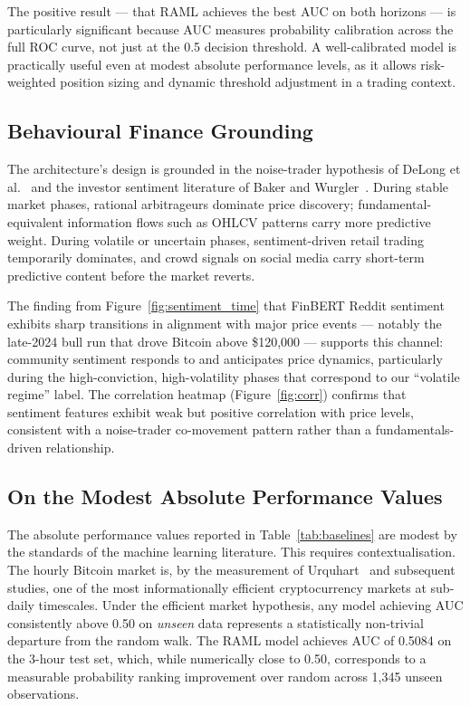 \documentclass[journal]{IEEEtran}
\newcommand{\raml}{\textsc{RAML}}
\begin{document}
The positive result — that \raml{} achieves the best AUC on both horizons —
is particularly significant because AUC measures probability calibration across
the full ROC curve, not just at the 0.5 decision threshold. A well-calibrated
model is practically useful even at modest absolute performance levels, as
it allows risk-weighted position sizing and dynamic threshold adjustment in
a trading context.

\subsection{Behavioural Finance Grounding}
The architecture's design is grounded in the noise-trader hypothesis of
DeLong et al.~\cite{delong1990noise} and the investor sentiment literature
of Baker and Wurgler~\cite{baker2007investor}. During stable market phases,
rational arbitrageurs dominate price discovery; fundamental-equivalent
information flows such as OHLCV patterns carry more predictive weight.
During volatile or uncertain phases, sentiment-driven retail trading
temporarily dominates, and crowd signals on social media carry short-term
predictive content before the market reverts.

The finding from Figure~\ref{fig:sentiment_time} that FinBERT Reddit sentiment
exhibits sharp transitions in alignment with major price events — notably
the late-2024 bull run that drove Bitcoin above \$120,000 — supports this
channel: community sentiment responds to and anticipates price dynamics,
particularly during the high-conviction, high-volatility phases that
correspond to our ``volatile regime'' label. The correlation heatmap
(Figure~\ref{fig:corr}) confirms that sentiment features exhibit weak but
positive correlation with price levels, consistent with a noise-trader
co-movement pattern rather than a fundamentals-driven relationship.

\subsection{On the Modest Absolute Performance Values}
The absolute performance values reported in Table~\ref{tab:baselines} are
modest by the standards of the machine learning literature. This requires
contextualisation. The hourly Bitcoin market is, by the measurement of
Urquhart~\cite{urquhart2016inefficiency} and subsequent studies, one of the
most informationally efficient cryptocurrency markets at sub-daily timescales.
Under the efficient market hypothesis, any model achieving AUC consistently
above 0.50 on \textit{unseen} data represents a statistically non-trivial
departure from the random walk. The \raml{} model achieves AUC of 0.5084
on the 3-hour test set, which, while numerically close to 0.50, corresponds
to a measurable probability ranking improvement over random across 1,345
unseen observations.
\end{document}

